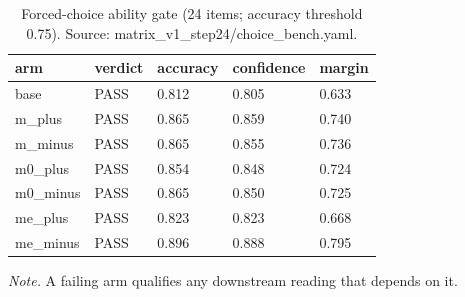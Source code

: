\documentclass[10pt]{article}
\begin{document}
\begin{table}[!t]
\centering
\footnotesize
\caption{ Forced-choice ability gate (24 items; accuracy threshold 0.75). Source: matrix\_v1\_step24/choice\_bench.yaml. }

\begin{tabular}{ lllll }
\toprule
arm & verdict & accuracy & confidence & margin \\
\midrule

base & PASS & 0.812 & 0.805 & 0.633 \\

m\_plus & PASS & 0.865 & 0.859 & 0.740 \\

m\_minus & PASS & 0.865 & 0.855 & 0.736 \\

m0\_plus & PASS & 0.854 & 0.848 & 0.724 \\

m0\_minus & PASS & 0.865 & 0.850 & 0.725 \\

me\_plus & PASS & 0.823 & 0.823 & 0.668 \\

me\_minus & PASS & 0.896 & 0.888 & 0.795 \\

\bottomrule
\end{tabular}

\par\footnotesize\emph{Note.} A failing arm qualifies any downstream reading that depends on it.
\end{table}
\end{document}
